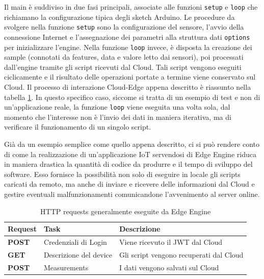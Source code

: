 Il main è suddiviso in due fasi principali, associate alle funzioni  \texttt{setup} e  \texttt{loop} che richiamano la configurazione tipica degli sketch Arduino. Le procedure da svolgere nella funzione  \texttt{setup} sono la configurazione del sensore, l'avvio della connessione Internet e l'assegnazione dei parametri alla struttura dati \texttt{options} per inizializzare l'engine. Nella funzione \texttt{loop} invece, è disposta la creazione dei sample (connotati da features, data e valore letto dai sensori), poi processati dall'engine tramite gli script ricevuti dal Cloud. Tali script vengono eseguiti ciclicamente e il risultato delle operazioni portate a termine viene conservato sul Cloud. Il processo di interazione Cloud-Edge appena descritto è riassunto nella tabella \ref{loop}. In questo specifico caso, siccome si tratta di un esempio di test e non di un'applicazione reale, la funzione \texttt{loop} viene eseguita una volta sola, dal momento che l'interesse non è l'invio dei dati in maniera iterativa, ma di verificare il funzionamento di un singolo script.

Già da un esempio semplice come quello appena descritto, ci si può rendere conto di come la realizzazione di un'applicazione IoT servendosi di Edge Engine riduca in maniera drastica la quantità di codice da produrre e il tempo di sviluppo del software. Esso fornisce la possibilità non solo di eseguire in locale gli scripts caricati da remoto, ma anche di inviare e ricevere delle informazioni dal Cloud e gestire eventuali malfunzionamenti comunicandone l'avvenimento al server online.

\begin{table}[H]
	\centering
	\begin{tabular}{|l|l|l|}
		\hline
		\textbf{Request} & \textbf{Task} & \textbf{Descrizione}\\
		\hline
		\textbf{POST} & Credenziali di Login & Viene ricevuto il JWT dal Cloud\\
		\hline
		\textbf{GET} & Descrizione del device & Gli script vengono recuperati dal Cloud\\
		\hline
		\textbf{POST} & Measurements & I dati vengono salvati sul Cloud\\	
		\hline
	\end{tabular}
	\caption{HTTP requests generalmente eseguite da Edge Engine}
	\label{loop}
\end{table}

